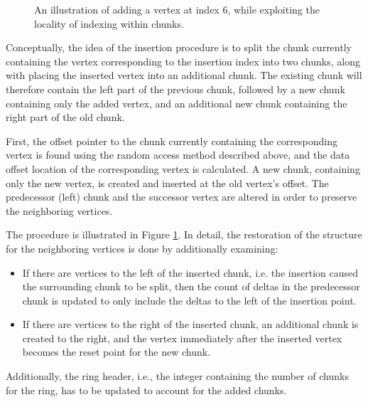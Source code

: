 \begin{figure}[htbp]
    \centering
    
    \caption{An illustration of adding a vertex at index 6, while exploiting the locality of indexing within chunks.}
    \label{img:addvertex}
\end{figure}

Conceptually, the idea of the insertion procedure is to split the chunk currently containing the vertex corresponding to the insertion index into two chunks, along with placing the inserted vertex into an additional chunk. The existing chunk will therefore contain the left part of the previous chunk, followed by a new chunk containing only the added vertex, and an additional new chunk containing the right part of the old chunk.  

First, the offset pointer to the chunk currently containing the corresponding vertex is found using the random access method described above, and the data offset location of the corresponding vertex is calculated. A new chunk, containing only the new vertex, is created and inserted at the old vertex's offset. The predecessor (left) chunk and the successor vertex are altered in order to preserve the neighboring vertices.


The procedure is illustrated in Figure \ref{img:addvertex}. In detail, the restoration of the structure for the neighboring vertices is done by additionally examining:
\begin{itemize}
    \item If there are vertices to the left of the inserted chunk, i.e. the insertion caused the surrounding chunk to be split, then the count of deltas in the predecessor chunk is updated to only include the deltas to the left of the insertion point.
    \item If there are vertices to the right of the inserted chunk, an additional chunk is created to the right, and the vertex immediately after the inserted vertex becomes the reset point for the new chunk.  
\end{itemize}

Additionally, the ring header, i.e., the integer containing the number of chunks for the ring, has to be updated to account for the added chunks.




